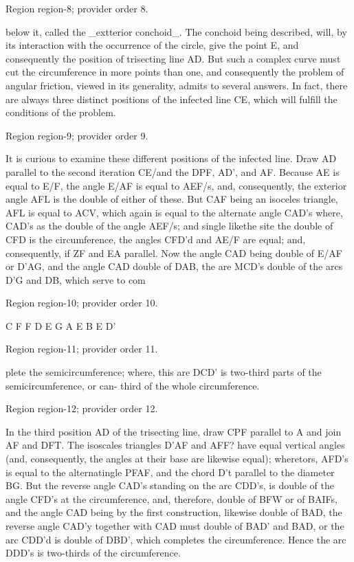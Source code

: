 \documentclass[11pt]{article}
\begin{document}
{\scriptsize\color{gray} Region region-8; provider order 8.\par}
\medskip

below it, called the \_extterior conchoid\_. The conchoid being described, will, by its interaction with the occurrence of the circle, give the point E, and consequently the position of trisecting line AD. But such a complex curve must cut the circumference in more points than one, and consequently the problem of angular friction, viewed in its generality, admits to several answers. In fact, there are always three distinct positions of the infected line CE, which will fulfill the conditions of the problem.
\par

{\scriptsize\color{gray} Region region-9; provider order 9.\par}
\medskip

It is curious to examine these different positions of the infected line. Draw AD parallel to the second iteration CE/and the DPF, AD’, and AF. Because AE is equal to E/F, the angle E/AF is equal to AEF/s, and, consequently, the exterior angle AFL is the double of either of these. But CAF being an isoceles triangle, AFL is equal to ACV, which again is equal to the alternate angle CAD’s where, CAD’s as the double of the angle AEF/s; and single likethe site the double of CFD is the circumference, the angles CFD’d and AE/F are equal; and, consequently, if ZF and EA parallel. Now the angle CAD being double of E/AF or D’AG, and the angle CAD double of DAB, the are MCD’s double of the arcs D’G and DB, which serve to com
\par

{\scriptsize\color{gray} Region region-10; provider order 10.\par}
\medskip

C
F
F
D
E
G
A
E
B
E
D'
\par

{\scriptsize\color{gray} Region region-11; provider order 11.\par}
\medskip

plete the semicircumference; where, this are DCD’ is two-third parts of the semicircumference, or can- third of the whole circumference.
\par

{\scriptsize\color{gray} Region region-12; provider order 12.\par}
\medskip

In the third position AD of the trisecting line, draw CPF parallel to A and join AF and DFT. The isoscales triangles D’AF and AFF? have equal vertical angles (and, consequently, the angles at their base are likewise equal); wheretors, AFD’s is equal to the alternatingle PFAF, and the chord D’t parallel to the diameter BG. But the reverse angle CAD’s standing on the arc CDD’s, is double of the angle CFD’s at the circumference, and, therefore, double of BFW or of BAIFs, and the angle CAD being by the first construction, likewise double of BAD, the reverse angle CAD’y together with CAD must double of BAD’ and BAD, or the arc CDD’d is double of DBD’, which completes the circumference. Hence the arc DDD’s is two-thirds of the circumference.
\par
\end{document}
